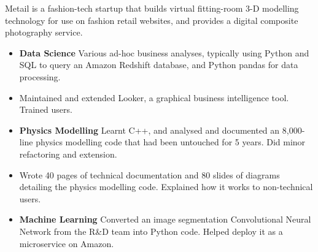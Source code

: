 \documentclass[11pt,a4paper,sans]{moderncv} %
\begin{document}
\vspace{0.2em}

{Metail is a fashion-tech startup that builds virtual fitting-room 3-D modelling technology for use on fashion retail websites, and provides a digital composite photography service.
	\begin{itemize}
		\item \textbf{Data Science} Various ad-hoc business analyses, typically using Python and SQL to query an Amazon Redshift database, and Python pandas for data processing.
		\item Maintained and extended Looker, a graphical business intelligence tool. Trained users.
		\item \textbf{Physics Modelling} Learnt C++, and analysed and documented an 8,000-line physics modelling code that had been untouched for 5 years. Did minor refactoring and extension.
		\item Wrote 40 pages of technical documentation and 80 slides of diagrams detailing the physics modelling code. Explained how it works to non-technical users.
		\item \textbf{Machine Learning} Converted an image segmentation Convolutional Neural Network from the R\&D team into Python code.  Helped deploy it as a microservice on Amazon.
	\end{itemize}
}
\end{document}
